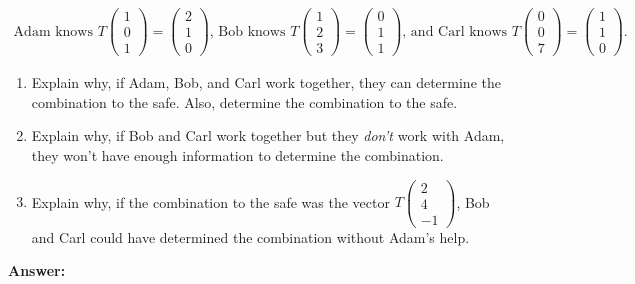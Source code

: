 \documentclass[10pt,letterpaper,final]{report}
\begin{document}
\begin{align*}
  \text{Adam knows }T\begin{pmatrix}1\\0\\1\end{pmatrix} = \begin{pmatrix}2\\1\\0\end{pmatrix}\text{, Bob knows }T\begin{pmatrix}1\\2\\3\end{pmatrix} = \begin{pmatrix}0\\1\\1\end{pmatrix} \text{, and Carl knows }T\begin{pmatrix}0\\0\\7\end{pmatrix} = \begin{pmatrix}1\\1\\0\end{pmatrix}.
\end{align*}

\begin{enumerate}[label=(\alph*)]
  \item Explain why, if Adam, Bob, and Carl work together, they can determine the combination to the safe. Also, determine the combination to the safe.
  \item Explain why, if Bob and Carl work together but they \emph{don't} work with Adam, they won't have enough information to determine the combination.
  \item Explain why, if the combination to the safe was the vector $T\begin{pmatrix}2\\4\\-1\end{pmatrix}$, Bob and Carl could have determined the combination without Adam's help.
\end{enumerate}


\medskip
\noindent\textbf{Answer:}
\end{document}
